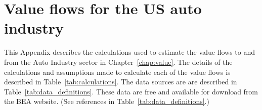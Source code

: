 %
%
%
\chapter{Value flows for the US auto industry}
\label{chap:auto_value_flows} 


This Appendix describes the calculations used 
to estimate the value flows to and from the Auto Industry sector 
in Chapter~\ref{chap:value}.  
The details of the calculations and assumptions made to calculate 
each of the value flows is described in Table~\ref{tab:calculations}. 
The data sources are are described in Table~\ref{tab:data_definitions}. 
These data are free and available for download 
from the BEA website.
(See references in Table~\ref{tab:data_definitions}.)

